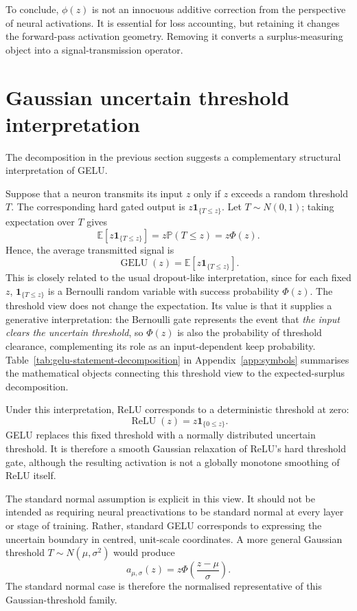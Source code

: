 \documentclass[11pt]{article}
\begin{document}
To conclude, $\phi(z)$ is not an innocuous additive correction from the perspective of neural activations. It is essential for loss accounting, but retaining it changes the forward-pass activation geometry. Removing it converts a surplus-measuring object into a signal-transmission operator.

\section{Gaussian uncertain threshold interpretation}
\label{sec:uncertain-threshold}

The decomposition in the previous section suggests a complementary structural interpretation of GELU.

Suppose that a neuron transmits its input $z$ only if $z$ exceeds a random threshold $T$.
The corresponding hard gated output is $z\mathbf{1}_{\{T\le z\}}$. Let $T\sim N(0,1)$; 
taking expectation over $T$ gives
$$
\mathbb{E}[z\mathbf{1}_{\{T\le z\}}]
=
z\mathbb{P}(T\le z)
=
z\Phi(z).
$$
Hence, the average transmitted signal is
$$
\operatorname{GELU}(z)
=
\mathbb{E}[z\mathbf{1}_{\{T\le z\}}].
$$
This is closely related to the usual dropout-like interpretation, since for each fixed $z$, $ \mathbf{1}_{\{T\le z\}} $ is a Bernoulli random variable with success probability $ \Phi(z) $. The threshold view does not change the expectation. Its value is that it supplies a generative interpretation: the Bernoulli gate represents the event that {\em the input clears the uncertain threshold}, so $ \Phi(z) $ is also the probability of threshold clearance, complementing its role as an input-dependent keep probability.
Table~\ref{tab:gelu-statement-decomposition} in Appendix~\ref{app:symbols} summarises the mathematical objects connecting this threshold view to the expected-surplus decomposition.

Under this interpretation, ReLU \cite{nair2010rectified} corresponds to a deterministic threshold at zero:
$$
\operatorname{ReLU}(z)=z\mathbf{1}_{\{0\leq z\}}.
$$
GELU replaces this fixed threshold with a normally distributed uncertain threshold. It is therefore a smooth Gaussian relaxation of ReLU's hard threshold gate, although the resulting activation is not a globally monotone smoothing of ReLU itself.

The standard normal assumption is explicit in this view.
It should not be intended as requiring neural preactivations to be standard normal at every layer or stage of training.
Rather, standard GELU corresponds to expressing the uncertain boundary in centred, unit-scale coordinates.
A more general Gaussian threshold $T\sim N(\mu,\sigma^2)$ would produce
$$
a_{\mu,\sigma}(z)=z\Phi\!\left(\frac{z-\mu}{\sigma}\right).
$$
The standard normal case is therefore the normalised representative of this Gaussian-threshold family.
\end{document}
